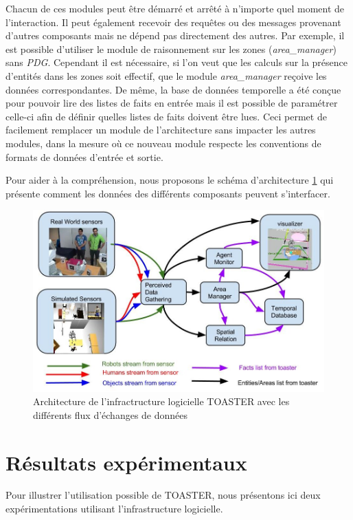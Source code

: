 \documentclass[a4paper,11pt,twoside]{StyleThese}
\begin{document}
Chacun de ces modules peut être démarré et arrêté à n'importe quel moment de l'interaction. Il peut également recevoir des requêtes ou des messages provenant d'autres composants mais ne dépend pas directement des autres. Par exemple, il est possible d'utiliser le module de raisonnement sur les zones (\textit{area\_manager}) sans \textit{PDG}. Cependant il est nécessaire, si l'on veut que les calculs sur la présence d'entités dans les zones soit effectif, que le module \textit{area\_manager} reçoive les données correspondantes.
De même, la base de données temporelle a été conçue pour pouvoir lire des listes de faits en entrée mais il est possible de paramétrer celle-ci afin de définir quelles listes de faits doivent être lues.
Ceci permet de facilement remplacer un module de l'architecture sans impacter les autres modules, dans la mesure où ce nouveau module respecte les conventions de formats de données d'entrée et sortie.

Pour aider à la compréhension, nous proposons le schéma d'architecture \ref{fig:toasterArch} qui présente comment les données des différents composants peuvent s'interfacer.


\begin{figure}[ht!]
 \centering
  \includegraphics[width=0.99\linewidth]{./img/toasterArch.jpg} 
  \caption {Architecture de l'infractructure logicielle TOASTER avec les différents flux d'échanges de données}
  \label{fig:toasterArch}
\end{figure}

\section{Résultats expérimentaux}
Pour illustrer l'utilisation possible de TOASTER, nous présentons ici deux expérimentations utilisant l'infrastructure logicielle.
\end{document}
